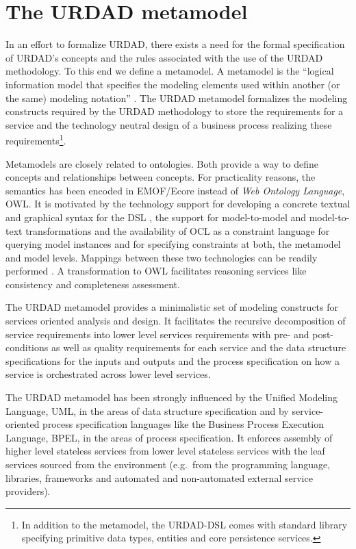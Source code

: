 \section{The URDAD metamodel \label{sec:metamodel}}

In an effort to formalize URDAD, there exists a need for the formal specification of URDAD's concepts and the rules associated with the use of the URDAD methodology. To this end we define a metamodel. A metamodel is the ``logical information model that specifies the modeling elements used within another (or the same) modeling notation'' \cite{_ieee_2003}. The URDAD metamodel formalizes the modeling constructs required by the URDAD methodology to store the requirements for a service and the technology neutral design of a business process realizing these requirements\footnote{In addition to the metamodel, the URDAD-DSL comes with standard library specifying primitive data types, entities and core persistence services.}. 

Metamodels are closely related to ontologies. Both provide a way to define concepts and relationships between concepts. For practicality reasons, the semantics has been encoded in EMOF/Ecore instead of {\em Web Ontology Language}, OWL\cite{zuo_zhihong_web_2003}. It is motivated by the technology support for developing a concrete textual and graphical syntax for the DSL \cite{heidenreich_derivation_2009}, the support for model-to-model \cite{_meta_2011} and model-to-text transformations \cite{model2text} and the availability of OCL as a constraint language \cite{OCL} for querying model instances and for specifying constraints at both, the metamodel and model levels. Mappings between these two technologies can be readily performed \cite{staab_model_2010}. A transformation to OWL facilitates reasoning services like consistency and completeness assessment.

The URDAD metamodel provides a minimalistic set of modeling constructs for services oriented analysis and design. It facilitates the recursive decomposition of service requirements into lower level services requirements with pre- and post-conditions as well as quality requirements for each service and the data structure specifications for the inputs and outputs and the process specification on how a service is orchestrated across lower level services. 


The URDAD metamodel has been strongly influenced by the Unified Modeling Language, UML, in the areas of data structure specification and by service-oriented process specification languages like the Business Process Execution Language, BPEL, in the areas of process specification. 
It enforces assembly of higher level stateless services from lower level stateless services with the leaf services sourced from the environment (e.g.\ from the programming language, libraries, frameworks and automated and non-automated external service providers). 

